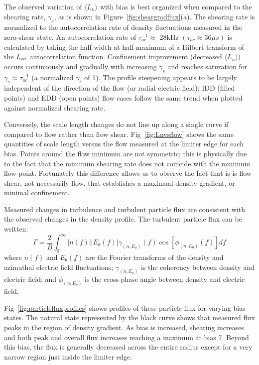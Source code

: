 \documentclass[aip,pop,amsmath,amssymb,preprint,superscriptaddress]{revtex4-1} %
\begin{document}
The observed variation of $\langle L_{n} \rangle$ with bias is best
organized when compared to the shearing rate, $\gamma_{s}$, as is
shown in Figure~\ref{fig:sheargradflux}(a).   The shearing rate is
normalized to the autocorrelation rate of density fluctuations
measured in the zero-shear state.  An autocorrelation rate of $\tau_{ac}^{-1} \approx $ 28kHz $(\tau_{ac} \approx 36\mu s)$ is calculated by taking the half-width at half-maximum of a Hilbert transform of the $I_{\rm sat}$
autocorrelation function.  Confinement improvement (decreased $\langle
L_n \rangle$) occurs continuously and gradually with increasing
$\gamma_{s}$ and reaches saturation for $\gamma_{s} \approx \tau_{ac}^{-1}$ (a normalized $\gamma_{s}$ of 1).  The profile steepening
appears to be largely independent of the direction of the flow (or radial electric field): IDD (filled points) and EDD (open points) flow cases follow the same trend when plotted against normalized shearing rate.

Conversely, the scale length changes do not line up along a single curve if compared to flow rather than flow shear. Fig~\ref{fig:Lnvsflow} shows the same quantities of scale length versus the flow measured at the limiter edge for each bias. Points around the flow minimum are not symmetric; this is physically due to the fact that the minimum shearing rate does not coincide with the minimum flow point. Fortunately this difference allows us to observe the fact that is is flow shear, not necessarily flow, that establishes a maximual density gradient, or minimal confinement.

Measured changes in turbulence and turbulent particle flux are
consistent with the observed changes in the density profile.  The
turbulent particle flux can be written\cite{powers74}:
\begin{equation}
\Gamma = \frac{2}{B} \int^{\infty}_{0} \lvert n(f) \rvert \lvert E_{\theta}(f) \rvert \gamma_{(n,E_{\theta})}(f) \cos [\phi_{(n,E_{\theta})}(f)] df
\label{eq:fluxint}
\end{equation}
where $n(f)$ and $E_\theta(f)$ are the Fourier transforms of
the density and azimuthal electric field fluctuations;
$\gamma_{(n,E_\theta)}$ is the coherency between density and electric
field; and $\phi_{(n,E_\theta)}$ is the cross-phase angle between
density and electric field.

Fig~\ref{fig:particlefluxprofiles} shows profiles of these particle flux for varying bias states. The natural state represented by the black curve shows that measured flux peaks in the region of density gradient. As bias is increased, shearing increases and both peak and overall flux increases reaching a maximum at bias 7. Beyond this bias, the flux is generally decreased across the entire radius except for a very narrow region just inside the limiter edge.
\end{document}
